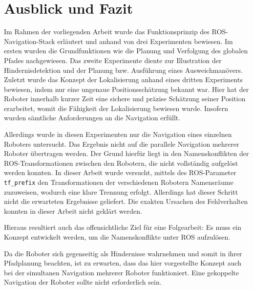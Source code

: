 \chapter{Ausblick und Fazit}
Im Rahmen der vorliegenden Arbeit wurde das Funktionsprinzip des ROS-Navigation-Stack erläutert und anhand von drei Experimenten bewiesen. Im ersten wurden die Grundfunktionen wie die Planung und Verfolgung des globalen Pfades nachgewiesen. Das zweite Experimente diente zur Illustration der Hindernisdetektion und der Planung bzw. Ausführung eines Ausweichmanövers. Zuletzt wurde das Konzept der Lokalisierung anhand eines dritten Experiments bewiesen, indem nur eine ungenaue Positionsschätzung bekannt war. Hier hat der Roboter innerhalb kurzer Zeit eine sichere und präzise Schätzung seiner Position erarbeitet, womit die Fähigkeit der Lokalisierung bewiesen wurde. Insofern wurden sämtliche Anforderungen an die Navigation erfüllt.


Allerdings wurde in diesen Experimenten nur die Navigation eines einzelnen Roboters untersucht. Das Ergebnis nicht auf die parallele Navigation mehrerer Roboter übertragen werden. Der Grund hierfür liegt in den Namenskonflikten der ROS-Transformationen zwischen den Robotern, die nicht vollständig aufgelöst werden konnten. In dieser Arbeit wurde versucht, mittels des ROS-Parameter \lstinline{tf_prefix}{} den Transformationen der verschiedenen Robotern Namensräume zuzuweisen, wodurch eine klare Trennung erfolgt. Allerdings hat dieser Schritt nicht die erwarteten Ergebnisse geliefert. Die exakten Ursachen des Fehlverhalten konnten in dieser Arbeit nicht geklärt werden.

Hieraus resultiert auch das offensichtliche Ziel für eine Folgearbeit: Es muss ein Konzept entwickelt werden, um die Namenskonflikte unter ROS aufzulösen.

Da die Roboter sich gegenseitig als Hindernisse wahrnehmen und somit in ihrer Pfadplanung beachten, ist zu erwarten, dass das hier vorgestellte Konzept auch bei der simultanen Navigation mehrerer Roboter funktioniert. Eine gekoppelte Navigation der Roboter sollte nicht erforderlich sein.